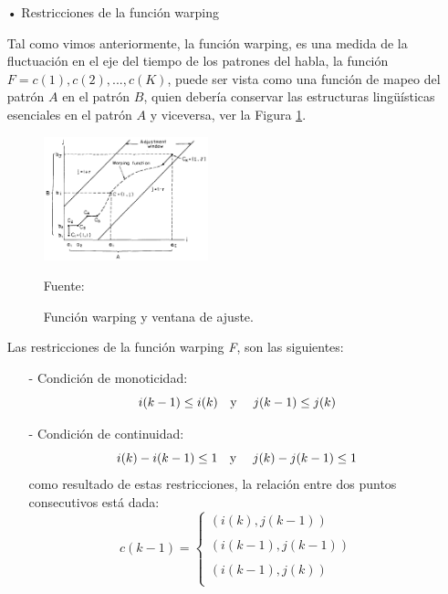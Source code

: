 \begin{enumerate}
\begin{enumerate}
\item[•]Restricciones de la función warping
\par
Tal como vimos anteriormente, la función warping, es una medida de la fluctuación en el eje del tiempo de los patrones del habla, la función $F = c(1), c(2),..., c(K)$, puede ser vista como una función de mapeo del patrón $A$ en el patrón $B$, quien debería conservar las estructuras lingüísticas esenciales en el patrón $A$ y viceversa, ver la Figura \ref{fig:figura2.52}.
\begin{figure}[H]
\begin{center}
\includegraphics[width=0.45\textwidth]{Imagenes/Cap2/image053}
\end{center}
\begin{center}
\vskip -0.5cm
\caption{\small{Función warping y ventana de ajuste.}}
\label{fig:figura2.52}
{\small{Fuente: \cite{sakoe}}}
\end{center}
\end{figure}

Las restricciones de la función warping \textit{F}, son las siguientes:
\begin{enumerate}
\item[-]Condición de monoticidad:
\begin{equation}
\label{eq:ecuacion80}
i(k - 1) \leq i(k)
\text{\quad y \quad}
j(k - 1) \leq j(k)
\end{equation}

\item[-]Condición de continuidad:
\begin{equation}
\label{eq:ecuacion81}
i(k) - i(k - 1) \leq 1
\text{\quad y \quad}
j(k) - j(k - 1) \leq 1
\end{equation}
como resultado de estas restricciones, la relación entre dos puntos consecutivos está dada:
\begin{equation}
\label{eq:ecuacion82}
c(k - 1) = \left\{ \begin{array}{lcl}
(i(k),j(k - 1)) \\
\\
(i(k - 1),j(k - 1)) \\
\\
(i(k - 1), j(k)) \\
\end{array}
\right.
\end{equation}


\end{enumerate}
\end{enumerate}
\end{enumerate}
